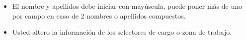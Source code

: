 \begin{itemize}
                            \begin{itemize}
                                \item El nombre y apellidos debe iniciar con mayúscula, puede poner más de uno por campo en caso de 2 nombres o apellidos compuestos.
                                \item Usted altero la información de los selectores de cargo o zona de trabajo.
                            \end{itemize}



                    \end{itemize}